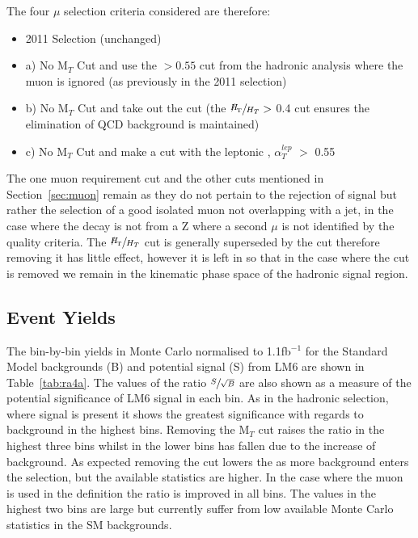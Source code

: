 The four $\mu$ selection criteria considered are therefore:

\begin{itemize}
\item 2011 Selection (unchanged)
\item a) No M$_{T}$ Cut and use the \alt $> 0.55$ cut from the hadronic analysis where the muon is ignored (as previously in the 2011 selection)
\item b) No M$_{T}$ Cut and take out the \alt cut (the $\sfrac{\MHT}{\HT} >$ 0.4 cut ensures the elimination of QCD background is maintained)
\item c) No M$_{T}$ Cut and make a cut with the leptonic \alt, $\alpha^{lep}_{T}$ $>$ 0.55
\end{itemize}

The one muon requirement cut and the other cuts mentioned in Section~\ref{sec:muon} remain as they do not pertain to the rejection of signal but rather the selection of a good isolated muon not overlapping with a jet, in the case where the decay is not from a Z where a second $\mu$ is not identified by the quality criteria. The $\sfrac{\MHT}{\HT}$ cut is generally superseded by the \alt cut therefore removing it has little effect, however it is left in so that in the case where the \alt cut is removed we remain in the kinematic phase space of the hadronic signal region. 

\subsection{Event Yields}

The bin-by-bin yields in Monte Carlo normalised to 1.1fb$^{-1}$ for the Standard Model backgrounds (B) and potential signal (S) from LM6 are shown in Table~\ref{tab:ra4a}. The values of the ratio $\sfrac{S}{\sqrt{B}}$ are also shown as a measure of the potential significance of LM6 signal in each bin. As in the hadronic selection, where signal is present it shows the greatest significance with regards to background in the highest \HT bins. Removing the M$_{T}$ cut raises the ratio \srb in the highest three bins whilst in the lower bins \srb has fallen due to the increase of background. As expected removing the \alt cut lowers the \srb as more background enters the selection, but the available statistics are higher. In the case where the muon is used in the \alt definition the ratio is improved in all bins. The values in the highest two bins are large but currently suffer from low available Monte Carlo statistics in the SM backgrounds. 

